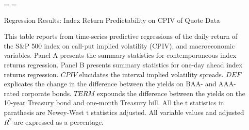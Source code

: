 \newpage
{}%
\recalctypearea
\pdfpageheight=\paperheight
\pdfpagewidth=\paperwidth


\begin{table}[h]

\caption{Regression Results: Index Return Predictability on CPIV of Quote Data}\label{table:regression2}
\begin{threeparttable}

\medskip

{\footnotesize 
This table reports from time-series predictive regressions of the daily return of the S\&P 500 index on call-put implied volatility (CPIV), and macroeconomic variables. Panel A presents the summary statistics for contemporaneous index returns regression. Panel B presents summary statistics for one-day ahead index returns regression. $CPIV$ elucidates the interval implied volatility spreads. $DEF$ explicates the change in the difference between the yields on BAA- and AAA-rated corporate bonds. $TERM$ expounds the difference between the yields on the 10-year Treasury bond and one-month Treasury bill. All the t statistics in parathesis are Newey-West t statistics adjusted. All variable values and adjusted $R^{2}$ are expressed as a percentage.  
}


\begin{subtable}[t]{\linewidth}


\end{subtable}
\end{threeparttable}
\end{table}
